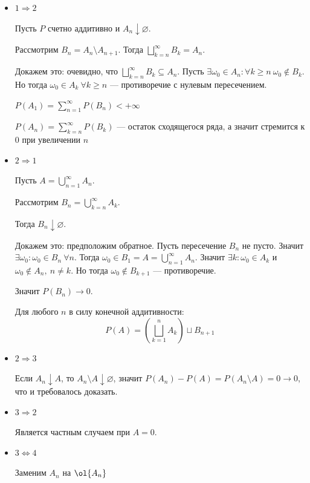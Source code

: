 \begin{itemize}
    \item
        \( 1 \Rightarrow 2 \)

        Пусть \( P \) счетно аддитивно и \( A_n \downarrow \varnothing \).

        Рассмотрим \( B_n = A_n \setminus A_{n + 1} \).
        Тогда \( \bigsqcup\limits_{k = n}^{\infty} B_k = A_n \).

        Докажем это:
        очевидно, что \( \bigsqcup\limits_{k = n}^{\infty} B_k \subseteq A_n \).
        Пусть \( \exists \omega_0 \in A_n : \forall k \geq n \ \omega_0 \notin B_k \).
        Но тогда \( \omega_0 \in A_k \ \forall k \geq n \) --- противоречие с нулевым пересечением.

        \( P(A_1) = \sum\limits_{n = 1}^{\infty} P(B_n) < +\infty \) 

        \( P(A_n) = \sum\limits_{k = n}^{\infty} P(B_k) \) --- остаток сходящегося ряда,
        а значит стремится к \( 0 \) при увеличении \( n \)
    \item
        \( 2 \Rightarrow 1 \)

        Пусть \( A = \bigcup\limits_{n = 1}^{\infty} A_n \).

        Рассмотрим \( B_n = \bigcup\limits_{k = n}^{\infty} A_k \).

        Тогда \( B_n \downarrow \varnothing \).

        Докажем это: предположим обратное.
        Пусть пересечение \( B_n \) не пусто.
        Значит \( \exists \omega_0 : \omega_0 \in B_n \ \forall n \).
        Тогда \( \omega_0 \in B_1 = A = \bigcup\limits_{n = 1}^{\infty} A_n \).
        Значит \( \exists k : \omega_0 \in A_k \) и \( \omega_0 \notin A_n, \ n \neq k \).
        Но тогда \( \omega_0 \notin B_{k + 1} \) --- противоречие.

        Значит \( P(B_n) \to 0 \).

        Для любого \( n \) в силу конечной аддитивности:
        \[
            P(A) = \left( \bigsqcup\limits_{k = 1}^{n} A_k \right) \sqcup B_{n + 1}
        \]
    \item
        \( 2 \Rightarrow 3 \)

        Если \( A_n \downarrow A \), то \( A_n \setminus A \downarrow \varnothing \),
        значит \( P(A_n) - P(A) = P(A_n \setminus A) = 0 \to 0 \),
        что и требовалось доказать.
    \item
        \( 3 \Rightarrow 2 \)

        Является частным случаем при \( A = 0 \).
    \item
        \( 3 \Leftrightarrow 4 \)

        Заменим \( A_n \) на \( \ol{A_n} \)
\end{itemize}

